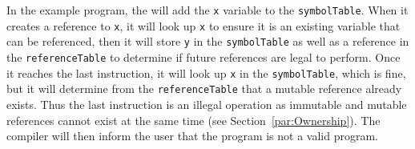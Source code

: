 In the example program, the \borrowChecker{} will add the \texttt{x} variable to the
\texttt{symbolTable}. When it creates a reference to \texttt{x}, it will look up
\texttt{x} to ensure it is an existing variable that can be referenced, then it will
store \texttt{y} in the \texttt{symbolTable} as well as a reference in the
\texttt{referenceTable} to determine if future references are legal to perform. 
Once it reaches the last instruction, it will look up \texttt{x} in the
\texttt{symbolTable}, which is fine, but it will determine from the
\texttt{referenceTable} that a mutable reference already exists. Thus the last
instruction is an illegal operation as immutable and mutable references cannot exist
at the same time (see Section~\ref{par:Ownership}). The compiler will then inform the
user that the program is not a valid \lang{} program.
